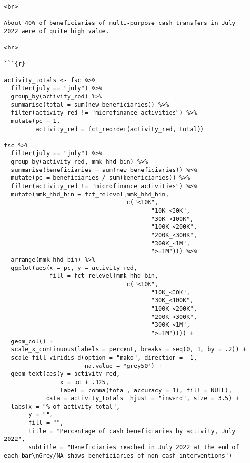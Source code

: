\documentclass[
]{article}
\begin{document}
\begin{verbatim}

<br>

About 40% of beneficiaries of multi-purpose cash transfers in July 2022 were of quite high value. 

<br>

```{r}

activity_totals <- fsc %>%
  filter(july == "july") %>% 
  group_by(activity_red) %>% 
  summarise(total = sum(new_beneficiaries)) %>%
  filter(activity_red != "microfinance activities") %>% 
  mutate(pc = 1, 
         activity_red = fct_reorder(activity_red, total))
  
fsc %>%  
  filter(july == "july") %>% 
  group_by(activity_red, mmk_hhd_bin) %>% 
  summarise(beneficiaries = sum(new_beneficiaries)) %>% 
  mutate(pc = beneficiaries / sum(beneficiaries)) %>% 
  filter(activity_red != "microfinance activities") %>% 
  mutate(mmk_hhd_bin = fct_relevel(mmk_hhd_bin, 
                                   c("<10K", 
                                          "10K_<30K", 
                                          "30K_<100K", 
                                          "100K_<200K",
                                          "200K_<300K", 
                                          "300K_<1M", 
                                          ">=1M"))) %>% 
  arrange(mmk_hhd_bin) %>% 
  ggplot(aes(x = pc, y = activity_red,
             fill = fct_relevel(mmk_hhd_bin, 
                                   c("<10K", 
                                          "10K_<30K", 
                                          "30K_<100K", 
                                          "100K_<200K",
                                          "200K_<300K", 
                                          "300K_<1M", 
                                          ">=1M")))) + 
  geom_col() + 
  scale_x_continuous(labels = percent, breaks = seq(0, 1, by = .2)) + 
  scale_fill_viridis_d(option = "mako", direction = -1, 
                       na.value = "grey50") + 
  geom_text(aes(y = activity_red, 
                x = pc + .125, 
                label = comma(total, accuracy = 1), fill = NULL), 
            data = activity_totals, hjust = "inward", size = 3.5) + 
  labs(x = "% of activity total", 
       y = "", 
       fill = "", 
       title = "Percentage of cash beneficiaries by activity, July 2022", 
       subtitle = "Beneficiaries reached in July 2022 at the end of each bar\nGrey/NA shows beneficiaries of non-cash interventions")

  
\end{verbatim}
\end{document}
